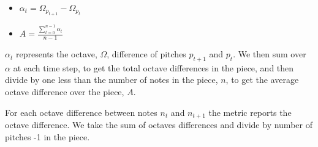 \documentclass[11pt]{article}
\begin{document}
\LARGE
\begin{itemize}
    \item $\alpha_t = \Omega_{p_{t+1}} - \Omega_{p_t}$
    \item $A = \frac{\sum_{t=0}^{n-1} \alpha_t}{n-1}$
\end{itemize}
\normalsize

\indent $\alpha_t$ represents the octave, $\Omega$, difference of pitches $p_{t+1}$ and $p_t$. We then sum over $\alpha$ at each time step, to get the total octave differences in the piece, and then divide by one less than the number of notes in the piece, $n$, to get the average octave difference over the piece, $A$.

For each octave difference between notes $n_t$ and $n_{t+1}$ the metric reports the octave difference. We take the sum of octaves differences and divide by number of pitches -1 in the piece.








\nocite{huang2018music, kotecha2018generating, vaswani2017attention, zhao2020verticalhorizontal}
\end{document}
